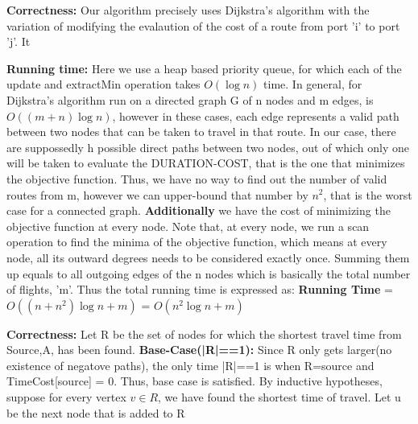 \documentclass{article}
\newcommand\correctness{\vspace{.10in}\textbf{Correctness: }}
\newcommand\runtime{\vspace{.10in}\textbf{Running time: }}
\begin{document}
 \correctness Our algorithm precisely uses Dijkstra's algorithm with the variation of modifying the evalaution of the cost of a route from port 'i' to port 'j'. It 

 \runtime Here we use a heap based priority queue, for which each of the update and extractMin operation takes $O(\log n)$ time. In general, for  Dijkstra's algorithm run on a directed graph G of n nodes and m edges, is $O((m+n)\log n)$, however in these cases, each edge represents a valid path between two nodes that can be taken to travel in that route. In our case, there are suppossedly h possible direct paths between two nodes, out of which only one will be taken to evaluate the DURATION-COST, that is the one that minimizes the objective function. Thus, we have no way to find out the number of valid routes from m, however we can upper-bound that number by $n^2$, that is the worst case for a connected graph. \textbf {Additionally} we have the cost of minimizing the objective function at every node. Note that, at every node, we run a scan operation to find the minima of the objective function, which means at every node, all its outward degrees needs to be considered exactly once. Summing them up equals to all outgoing edges of the n nodes which is basically the total number of flights, 'm'. Thus the total running time is expressed as: \newline
\textbf {Running Time} = $O((n + n^2)\log n + m)$ = $O(n^2\log n + m)$ \newline

\correctness 
  Let R be the set of nodes for which the shortest travel time from Source,A, has been found. \textbf {Base-Case(|R|==1):}  Since R only gets larger(no existence of negatove paths), the only time |R|==1 is when R={source} and TimeCost[source] = 0. Thus, base case is satisfied. \newline
  By inductive hypotheses, suppose for every vertex $v \in R$, we have found the shortest time of travel. Let u be the next node that is added to R
\end{document}

